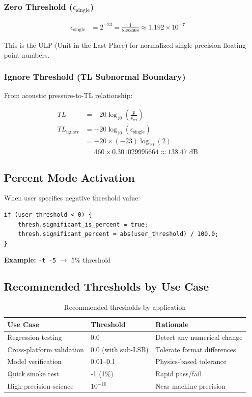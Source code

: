 \documentclass[11pt,letterpaper]{article}
\begin{document}
\subsubsection{Zero Threshold ($\epsilon_{\text{single}}$)}

\begin{align}
    \epsilon_{\text{single}} &= 2^{-23} = \frac{1}{8388608} \approx 1.192 \times 10^{-7}
\end{align}

This is the ULP (Unit in the Last Place) for normalized single-precision floating-point numbers.

\subsubsection{Ignore Threshold (TL Subnormal Boundary)}

From acoustic pressure-to-TL relationship:

\begin{align}
    TL &= -20 \log_{10}\left(\frac{p}{p_{\text{ref}}}\right) \\
    TL_{\text{ignore}} &= -20 \log_{10}(\epsilon_{\text{single}}) \\
    &= -20 \times (-23) \log_{10}(2) \\
    &= 460 \times 0.301029995664 \approx 138.47 \text{ dB}
\end{align}

\subsection{Percent Mode Activation}

When user specifies negative threshold value:
\begin{verbatim}
if (user_threshold < 0) {
    thresh.significant_is_percent = true;
    thresh.significant_percent = abs(user_threshold) / 100.0;
}
\end{verbatim}

\textbf{Example:} \texttt{-t -5} $\to$ 5\% threshold

\subsection{Recommended Thresholds by Use Case}

\begin{table}[h]
\centering
\begin{tabular}{@{}lll@{}}
\toprule
\textbf{Use Case} & \textbf{Threshold} & \textbf{Rationale} \\ \midrule
Regression testing & 0.0 & Detect any numerical change \\
Cross-platform validation & 0.0 (with sub-LSB) & Tolerate format differences \\
Model verification & 0.01--0.1 & Physics-based tolerance \\
Quick smoke test & -1 (1\%) & Rapid pass/fail \\
High-precision science & $10^{-10}$ & Near machine precision \\ \bottomrule
\end{tabular}
\caption{Recommended thresholds by application}
\label{tab:recommended}
\end{table}
\end{document}
